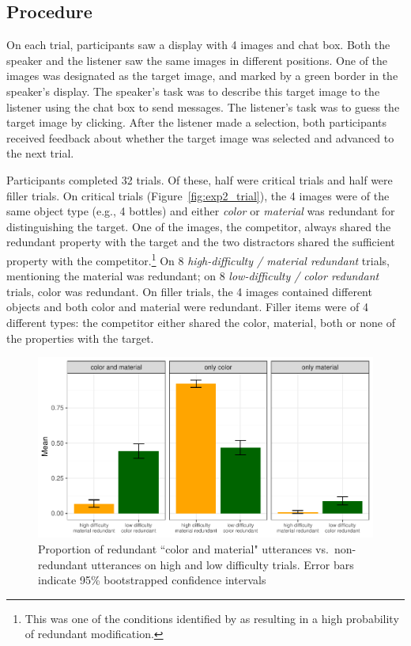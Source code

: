 \documentclass[12pt,letterpaper]{article}
\begin{document}
\subsection{Procedure} 

On each trial, participants saw a display with 4 images and chat box. Both the speaker and the listener saw the same images in different positions. One of the images was designated as the target image, and marked by a green border in the speaker's display. The speaker's task was to describe this target image to the listener using the chat box to send messages. The listener's task was to guess the target image by clicking. After the listener made a selection, both participants received feedback about whether the target image was selected and advanced to the next trial. 

Participants completed 32 trials. Of these, half were critical trials and half were filler trials. On critical trials (Figure~\ref{fig:exp2_trial}), the 4 images were of the same object type (e.g., 4 bottles) and either \textit{color} or \textit{material} was redundant for distinguishing the target. One of the images, the competitor, always shared the redundant property with the target and the two distractors shared the sufficient property with the competitor.\footnote{This was one of the conditions identified by \citet{DegenEtAl2020} as resulting in a high probability of redundant modification.} On 8 \emph{high-difficulty / material redundant} trials, mentioning the material was redundant; on 8 \emph{low-difficulty / color redundant} trials, color was redundant. On filler trials, the 4 images contained different objects and both color and material were redundant. Filler items were of 4 different types: the competitor either shared the color, material, both or none of the properties with the target. 

\begin{figure}[hb]
\centering
\includegraphics[width=.8\textwidth]{plots/exp2_proportion.pdf}
\caption{Proportion of redundant ``color and material" utterances vs.~non-redundant utterances on high and low difficulty trials. Error bars indicate 95\% bootstrapped confidence intervals}
\label{fig:exp2_proportion}
\end{figure}
\end{document}
